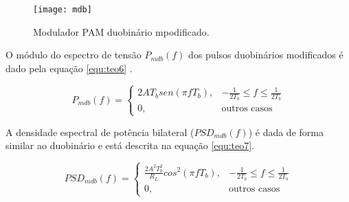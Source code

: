 \begin{figure}[H]
  \centering
  \caption{Modulador PAM duobinário mpodificado.}
  \texttt{[image: mdb]}
  \label{fig:mdb}
\end{figure}

O módulo do espectro de tensão $P_{mdb}(f)$ dos pulsos duobinários modificados 
é dado pela equação \ref{equ:teo6} \cite{Medeiros}.

\begin{equation}
\label{equ:teo6}
P_{mdb}(f) = 
\begin{cases}
2AT_b sen(\pi f T_b), & -\frac{1}{2T_b} \leq f \leq \frac{1}{2T_b} \\
0, & \mbox{outros casos} 
\end{cases}
\end{equation}

A densidade espectral de potência bilateral ($PSD_{mdb} (f)$) é dada de forma 
similar ao duobinário e está descrita na equação \ref{equ:teo7}.

\begin{equation}
\label{equ:teo7}
PSD_{mdb}(f) = 
\begin{cases}
\frac{2A^2T_b^2}{R_L}cos^2	(\pi f T_b), & -\frac{1}{2T_b} \leq f \leq 
\frac{1}{2T_b} \\
0, & \mbox{outros casos} 
\end{cases}
\end{equation}


